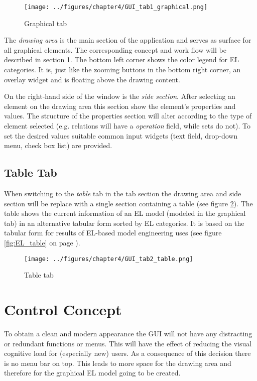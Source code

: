 \documentclass[twoside, openright, 12pt]{book}
\begin{document}
\begin{figure}[htb]
	\centering
	\texttt{[image: ../figures/chapter4/GUI\_tab1\_graphical.png]}
	\caption{Graphical tab}
	\label{fig:GUI_tab1_graphical}
\end{figure}

\noindent
The \textit{drawing area} is the main section of the application and serves as surface for all graphical elements.
The corresponding concept and work flow will be described in section \ref{editor_control_concept}.
The bottom left corner shows the color legend for EL categories.
It is, just like the zooming buttons in the bottom right corner, an overlay widget and is floating above the drawing content.

On the right-hand side of the window is the \textit{side section}.
After selecting an element on the drawing area this section show the element's properties and values.
The structure of the properties section will alter according to the type of element selected (e.g. relations will have a \textit{operation} field, while sets do not).
To set the desired values suitable common input widgets (text field, drop-down menu, check box list) are provided.



\subsection{Table Tab}
\label{editor_table}
When switching to the \textit{table} tab in the tab section the drawing area and side section will be replace with a single section containing a table (see figure \ref{fig:GUI_tab2_table}).
The table shows the current information of an EL model (modeled in the graphical tab) in an alternative tabular form sorted by EL categories.
It is based on the tabular form for results of EL-based model engineering \cite{Amthor18} uses (see figure \ref{fig:EL_table} on page \pageref{fig:EL_table}).

\begin{figure}[htb]
	\centering
	\texttt{[image: ../figures/chapter4/GUI\_tab2\_table.png]}
	\caption{Table tab}
	\label{fig:GUI_tab2_table}
\end{figure}



\section{Control Concept}
\label{editor_control_concept}
To obtain a clean and modern appearance the GUI will not have any distracting or redundant functions or menus.
This will have the effect of reducing the visual cognitive load for (especially new) users.
As a consequence of this decision there is no menu bar on top.
This leads to more space for the drawing area and therefore for the graphical EL model going to be created.
\end{document}
